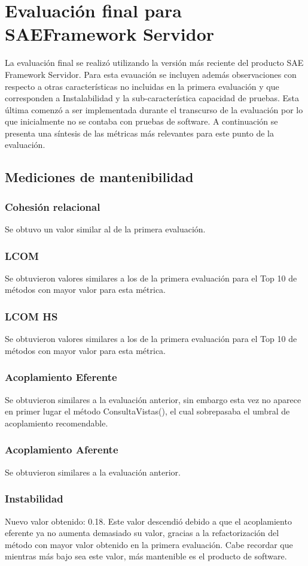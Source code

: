 \section{Evaluación final para SAEFramework Servidor}
La evaluación final se realizó utilizando la versión más reciente del producto 
SAE Framework Servidor. Para esta evauación se incluyen además observaciones 
con respecto a otras características no incluidas en la primera evaluación y 
que corresponden a Instalabilidad y la sub-característica capacidad de pruebas. 
Esta última comenzó a ser implementada durante el transcurso de la evaluación
por lo que inicialmente no se contaba con pruebas de software.
A continuación se presenta una síntesis de las métricas más relevantes para 
este punto de la evaluación.

\subsection{Mediciones de mantenibilidad}

\subsubsection{Cohesión relacional}
Se obtuvo un valor similar al de la primera evaluación.
\subsubsection{LCOM}
Se obtuvieron valores similares a los de la primera evaluación para el Top 10 de métodos
con mayor valor para esta métrica.
\subsubsection{LCOM HS}
Se obtuvieron valores similares a los de la primera evaluación para el Top 10 de métodos
con mayor valor para esta métrica.
\subsubsection{Acoplamiento Eferente}
Se obtuvieron similares a la evaluación anterior, sin embargo esta vez no aparece en primer lugar
el método ConsultaVistas(), el cual sobrepasaba el umbral de acoplamiento recomendable.
\subsubsection{Acoplamiento Aferente}
Se obtuvieron similares a la evaluación anterior.
\subsubsection{Instabilidad}
Nuevo valor obtenido: 0.18.
Este valor descendió debido a que el acoplamiento eferente ya no aumenta 
demasiado su valor, gracias a la refactorización del método con mayor valor obtenido en la primera evaluación.
Cabe recordar que mientras más bajo sea este valor, más mantenible es el producto de software.
